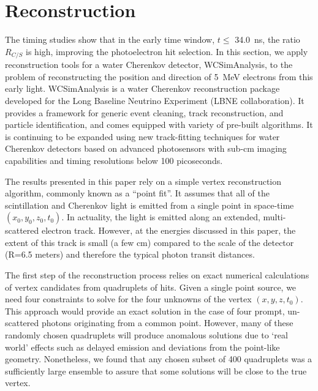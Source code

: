 \documentclass[cits]{JINST}
\begin{document}
\section{Reconstruction}
\label{reconstruction_sec}

The timing studies show that in the early time window, $t\leq$
34.0~ns, the ratio $R_{C/S}$ is high, improving the photoelectron hit selection. In this section, we apply
reconstruction tools for a water Cherenkov detector, WCSimAnalysis,
to the problem of reconstructing the position and direction of 5~MeV
electrons from this early light.  WCSimAnalysis is a water Cherenkov
reconstruction package developed for the Long Baseline Neutrino
Experiment (LBNE collaboration)\cite{Blake}. It provides a framework
for generic event cleaning, track reconstruction, and particle
identification, and comes equipped with variety of pre-built
algorithms. It is continuing to be expanded using new track-fitting
techniques for water Cherenkov detectors\cite{Sanchez2012525} based on
advanced photosensors with sub-cm imaging capabilities and timing
resolutions below 100 picoseconds\cite{LAPPDSum,LAPPDTDR}.

The results presented in this paper rely on a simple vertex
reconstruction algorithm, commonly known as a ``point
fit''\cite{SuperKalgo}. It assumes that all of the scintillation and
Cherenkov light is emitted from a single point in space-time
$(x_0,y_0,z_0,t_0)$. In actuality, the light is emitted along an
extended, multi-scattered electron track. However, at the energies
discussed in this paper, the extent of this track is small (a few cm)
compared to the scale of the detector (R=6.5 meters) and therefore the typical
photon transit distances.

The first step of the reconstruction process relies on exact numerical
calculations of vertex candidates from quadruplets of hits. Given a
single point source, we need four constraints to solve for the four
unknowns of the vertex $(x,y,z,t_0)$\cite{Smy}. This approach
would provide an exact solution in the case of four prompt,
un-scattered photons originating from a common point. However, many of
these randomly chosen quadruplets will produce anomalous solutions due
to `real world' effects such as delayed emission and deviations from the
point-like geometry. Nonetheless, we found that any chosen subset of
400 quadruplets was a sufficiently large ensemble to assure that some
solutions will be close to the true vertex.
\end{document}
